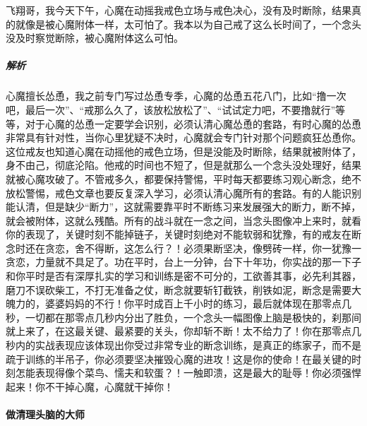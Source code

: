 \begin{case}
    飞翔哥，我今天下午，心魔在动摇我戒色立场与戒色决心，没有及时断除，结果真的就像是被心魔附体一样，太可怕了。我本以为自己戒了这么长时间了，一个念头没及时察觉断除，被心魔附体这么可怕。
    \subparagraph{解析} 心魔擅长怂恿，我之前专门写过怂恿专季，心魔的怂恿五花八门，比如“撸一次吧，最后一次”、“戒那么久了，该放松放松了”、“试试定力吧，不要撸就行”等等，对于心魔的怂恿一定要学会识别，必须认清心魔怂恿的套路，有时心魔的怂恿非常具有针对性，当你心里犹疑不决时，心魔就会专门针对那个问题疯狂怂恿你。这位戒友也知道心魔在动摇他的戒色立场，但是没能及时断除，结果就被附体了，身不由己，彻底沦陷。他戒的时间也不短了，但是就那么一个念头没处理好，结果就被心魔攻破了。不管戒多久，都要保持警惕，平时每天都要练习观心断念，绝不放松警惕，戒色文章也要反复深入学习，必须认清心魔所有的套路。有的人能识别能认清，但是缺少“断力”，这就需要靠平时不断练习来发展强大的断力，断不掉，就会被附体，这就么残酷。所有的战斗就在一念之间，当念头图像冲上来时，就看你的表现了，关键时刻不能掉链子，关键时刻绝对不能软弱和犹豫，有的戒友在断念时还在贪恋，舍不得断，这怎么行？！必须果断坚决，像劈砖一样，你一犹豫一贪恋，力量就不具足了。功在平时，台上一分钟，台下十年功，你实战的那一下子和你平时是否有深厚扎实的学习和训练是密不可分的，工欲善其事，必先利其器，磨刀不误砍柴工，不打无准备之仗，断念就要斩钉截铁，削铁如泥，断念是需要大魄力的，婆婆妈妈的不行！你平时成百上千小时的练习，最后就体现在那零点几秒，一切都在那零点几秒内分出了胜负，一个念头一幅图像上脑是极快的，刹那间就上来了，在这最关键、最紧要的关头，你却斩不断！太不给力了！你在那零点几秒内的实战表现应该体现出你受过非常专业的断念训练，是真正的练家子，而不是疏于训练的半吊子，你必须要坚决摧毁心魔的进攻！这是你的使命！在最关键的时刻怎能表现得像个菜鸟、懦夫和软蛋？！一触即溃，这是最大的耻辱！你必须强悍起来！你不干掉心魔，心魔就干掉你！
\end{case}

\paragraph{做清理头脑的大师}

